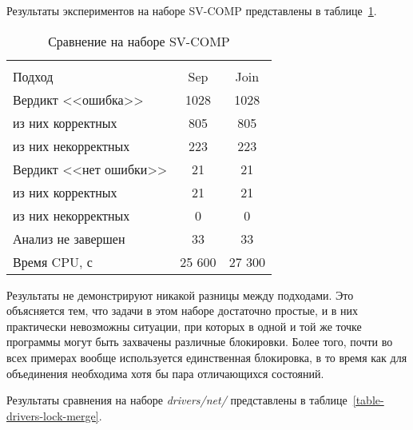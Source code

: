 Результаты экспериментов на наборе SV-COMP представлены в таблице~\ref{table-svcomp-lock-merge}.

  \begin{table}[h]\footnotesize \centering
    \caption{Сравнение на наборе SV-COMP}
  	\label{table-svcomp-lock-merge}
    \begin{tabular}{ | l | c | c |}
      \hline
      		& 		\multicolumn{2}{c|}{\theory}  \\
      Подход         				&  Sep		& Join 		\\ \hline
      Вердикт <<ошибка>> 				& 1028   	& 1028   	\\ 
  \hspace{0.5cm} из них корректных 	& 805 		& 805 	 	\\ 
  \hspace{0.5cm} из них некорректных & 223 		& 223 	   	\\ \hline
      Вердикт <<нет ошибки>>  		& 21    	& 21     	\\ 
  \hspace{0.5cm} из них корректных 	& 21 		& 21    	\\
  \hspace{0.5cm} из них некорректных & 0 		& 0    	  	\\ \hline
      Анализ не завершен       		& 33    	& 33      	\\ \hline
      Время CPU, с   				& 25 600 	& 27 300  	\\ 
      \hline
    \end{tabular}
  \end{table}

Результаты не демонстрируют никакой разницы между подходами.
Это объясняется тем, что задачи в этом наборе достаточно простые, и в них практически невозможны ситуации, при которых в одной и той же точке программы могут быть захвачены различные блокировки.
Более того, почти во всех примерах вообще используется единственная блокировка, в то время как для объединения необходима хотя бы пара отличающихся состояний.

Результаты сравнения на наборе \textit{drivers/net/} представлены в таблице~\ref{table-drivers-lock-merge}.

